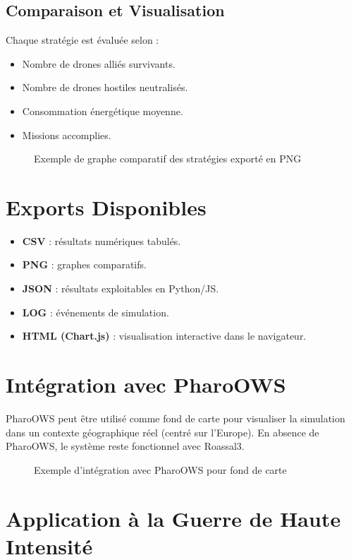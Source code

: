 \documentclass[a4paper,11pt]{article}
\begin{document}
\subsection{Comparaison et Visualisation}
Chaque stratégie est évaluée selon :
\begin{itemize}
  \item Nombre de drones alliés survivants.
  \item Nombre de drones hostiles neutralisés.
  \item Consommation énergétique moyenne.
  \item Missions accomplies.
\end{itemize}

\begin{figure}[h!]
\centering
{}
\caption{Exemple de graphe comparatif des stratégies exporté en PNG}
\end{figure}

\section{Exports Disponibles}
\begin{itemize}
  \item \textbf{CSV} : résultats numériques tabulés.
  \item \textbf{PNG} : graphes comparatifs.
  \item \textbf{JSON} : résultats exploitables en Python/JS.
  \item \textbf{LOG} : événements de simulation.
  \item \textbf{HTML (Chart.js)} : visualisation interactive dans le navigateur.
\end{itemize}

\section{Intégration avec PharoOWS}
PharoOWS peut être utilisé comme fond de carte pour visualiser la simulation
dans un contexte géographique réel (centré sur l’Europe).  
En absence de PharoOWS, le système reste fonctionnel avec Roassal3.

\begin{figure}[h!]
\centering
{}
\caption{Exemple d’intégration avec PharoOWS pour fond de carte}
\end{figure}

\section{Application à la Guerre de Haute Intensité}
\end{document}
